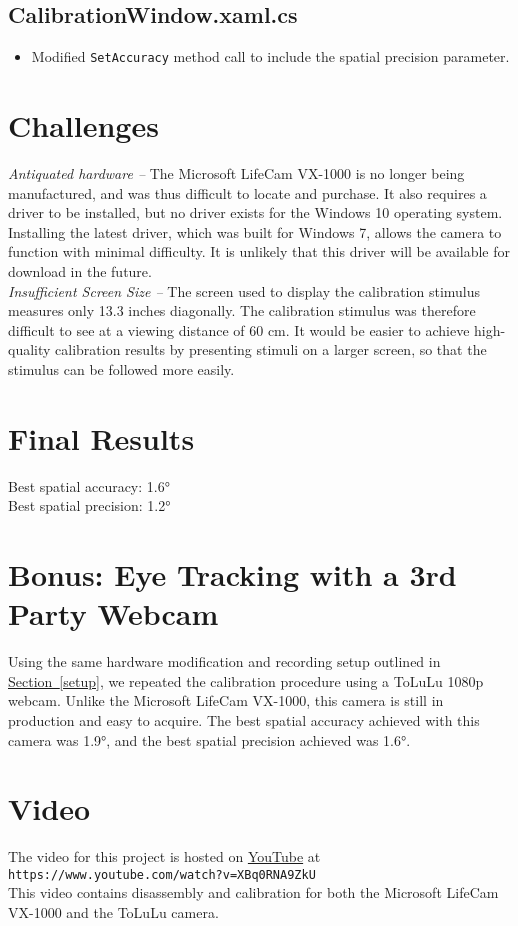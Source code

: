 \documentclass[11pt]{article}
\begin{document}
\subsection*{CalibrationWindow.xaml.cs}
    \begin{itemize}
        \item Modified \texttt{SetAccuracy} method call to include the spatial
        precision parameter.
    \end{itemize}

\section{Challenges}
\label{sec:challenges} %
\textit{Antiquated hardware -- }The Microsoft LifeCam VX-1000 is no longer being
manufactured, and was thus difficult to locate and purchase.
It also requires a driver to be installed, but no driver exists for the Windows
10 operating system.
Installing the latest driver, which was built for Windows 7, allows the camera
to function with minimal difficulty.
It is unlikely that this driver will be available for download in the future. \\

\textit{Insufficient Screen Size -- } The screen used to display the calibration
stimulus measures only 13.3 inches diagonally.
The calibration stimulus was therefore difficult to see at a viewing distance of
60 cm.
It would be easier to achieve high-quality calibration results by presenting
stimuli on a larger screen, so that the stimulus can be followed more easily.

\section{Final Results}
\label{sec:final-results} %
Best spatial accuracy: \ang{1.6} \\
Best spatial precision: \ang{1.2}

\section{Bonus: Eye Tracking with a 3rd Party Webcam}
\label{sec:bonus}
Using the same hardware modification and recording setup outlined in
\hyperref[setup]{Section~\ref{setup}}, we repeated the calibration procedure
using a ToLuLu 1080p webcam.
Unlike the Microsoft LifeCam VX-1000, this camera is still in production and
easy to acquire.
The best spatial accuracy achieved with this camera was \ang{1.9}, and the best
spatial precision achieved was \ang{1.6}.

\section{Video}
\label{sec:video}
The video for this project is hosted on
\href{https://www.youtube.com/watch?v=XBq0RNA9ZkU}{YouTube} at
\texttt{https://www.youtube.com/watch?v=XBq0RNA9ZkU} \\
This video contains disassembly and calibration for both the
Microsoft LifeCam VX-1000 and the ToLuLu camera.


\end{document}
